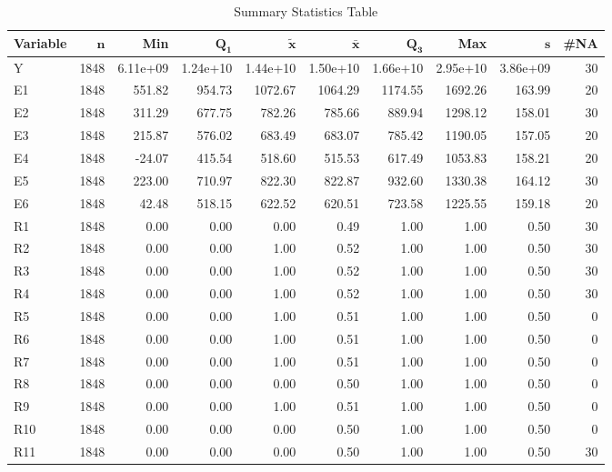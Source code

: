 \begin{table}[ht]
\centering
\begingroup\footnotesize
\caption{Summary Statistics Table} 
\label{tab:summary}
\begin{adjustbox}{width=\textwidth}
\begin{tabular}{lrrrrrrrrr}
 \textbf{Variable} & $\mathbf{n}$ & \textbf{Min} & $\mathbf{Q_1}$ & $\mathbf{\widetilde{x}}$ & $\mathbf{\bar{x}}$ & $\mathbf{Q_3}$ & \textbf{Max} & $\mathbf{s}$ & \textbf{\#NA} \\ 
  \hline
Y & 1848 & 6.11e+09 & 1.24e+10 & 1.44e+10 & 1.50e+10 & 1.66e+10 & 2.95e+10 & 3.86e+09 & 30 \\ 
  E1 & 1848 & 551.82 & 954.73 & 1072.67 & 1064.29 & 1174.55 & 1692.26 & 163.99 & 20 \\ 
  E2 & 1848 & 311.29 & 677.75 & 782.26 & 785.66 & 889.94 & 1298.12 & 158.01 & 30 \\ 
  E3 & 1848 & 215.87 & 576.02 & 683.49 & 683.07 & 785.42 & 1190.05 & 157.05 & 20 \\ 
  E4 & 1848 & -24.07 & 415.54 & 518.60 & 515.53 & 617.49 & 1053.83 & 158.21 & 20 \\ 
  E5 & 1848 & 223.00 & 710.97 & 822.30 & 822.87 & 932.60 & 1330.38 & 164.12 & 30 \\ 
  E6 & 1848 & 42.48 & 518.15 & 622.52 & 620.51 & 723.58 & 1225.55 & 159.18 & 20 \\ 
  R1 & 1848 & 0.00 & 0.00 & 0.00 & 0.49 & 1.00 & 1.00 & 0.50 & 30 \\ 
  R2 & 1848 & 0.00 & 0.00 & 1.00 & 0.52 & 1.00 & 1.00 & 0.50 & 30 \\ 
  R3 & 1848 & 0.00 & 0.00 & 1.00 & 0.52 & 1.00 & 1.00 & 0.50 & 30 \\ 
  R4 & 1848 & 0.00 & 0.00 & 1.00 & 0.52 & 1.00 & 1.00 & 0.50 & 30 \\ 
  R5 & 1848 & 0.00 & 0.00 & 1.00 & 0.51 & 1.00 & 1.00 & 0.50 &  0 \\ 
  R6 & 1848 & 0.00 & 0.00 & 1.00 & 0.51 & 1.00 & 1.00 & 0.50 &  0 \\ 
  R7 & 1848 & 0.00 & 0.00 & 1.00 & 0.51 & 1.00 & 1.00 & 0.50 &  0 \\ 
  R8 & 1848 & 0.00 & 0.00 & 0.00 & 0.50 & 1.00 & 1.00 & 0.50 &  0 \\ 
  R9 & 1848 & 0.00 & 0.00 & 1.00 & 0.51 & 1.00 & 1.00 & 0.50 &  0 \\ 
  R10 & 1848 & 0.00 & 0.00 & 0.00 & 0.50 & 1.00 & 1.00 & 0.50 &  0 \\ 
  R11 & 1848 & 0.00 & 0.00 & 0.00 & 0.50 & 1.00 & 1.00 & 0.50 & 30 \\ 

\end{tabular}
\end{adjustbox}
\end{table}
